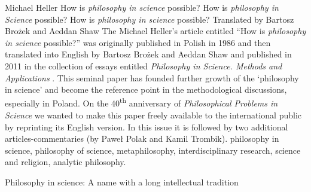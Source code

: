 \begin{artengenv}{Michael Heller}
	{How is \textit{philosophy in science} possible?}
	{How is \textit{philosophy in Science} possible?}
	{How is \textit{philosophy in science} possible?}
	{Translated by Bartosz Brożek and Aeddan Shaw\label{heller-start}}
	{The Michael Heller's article entitled ``How is \textit{philosophy in science} possible?'' was originally published in Polish in 1986
		\parencite[see][]{heller_jakmozliwa_1986} and then translated into English by Bartosz Brożek and Aeddan Shaw and published in 2011 in the collection of essays entitled \textit{Philosophy in Science. Methods and Applications} \parencite{heller_howpossible_2011}. This seminal paper has founded further growth of the `philosophy in science' and become the reference point in the methodological discussions, especially in Poland. On the 40\textsuperscript{th} anniversary of \textit{Philosophical Problems in Science} we wanted to make this paper freely available to the international public by reprinting its English version. In this issue it is followed by two additional articles-commentaries (by Paweł Polak and Kamil Trombik).}
	{philosophy in science, philosophy of science, metaphilosophy, interdisciplinary research, science and religion, analytic philosophy.}


Philosophy in science: A name with a long intellectual tradition



\end{artengenv}
